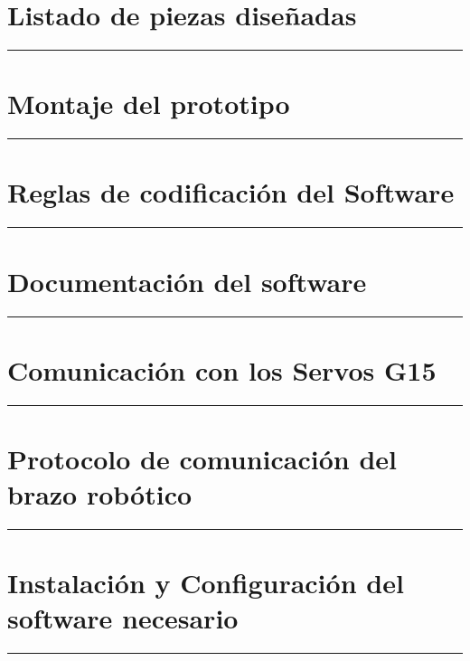 \appendix
{}


     \chapter{Listado de piezas diseñadas} \label{app:listadoPiezas}
         \hrule
         \vspace{3mm}
     	 

     \chapter{Montaje del prototipo} \label{app:montajePiezas}
         \hrule
         \vspace{3mm}
         

     \chapter{Reglas de codificación del Software} \label{app:codificacionSW}
        \hrule
        \vspace{3mm}
     	

     \chapter{Documentación del software} \label{app:documentacion_software}
         \hrule
         \vspace{3mm}
     	 

     \chapter{Comunicación con los Servos G15} \label{app:registros_g15}
	     \hrule
	     \vspace{3mm}
	     

    \chapter{Protocolo de comunicación del brazo robótico} \label{app:comunicacion_brazo}
        \hrule
        \vspace{3mm}
        

     \chapter{Instalación y Configuración del software necesario} \label{app:instalacion_software}
         \hrule
         \vspace{3mm}
         


